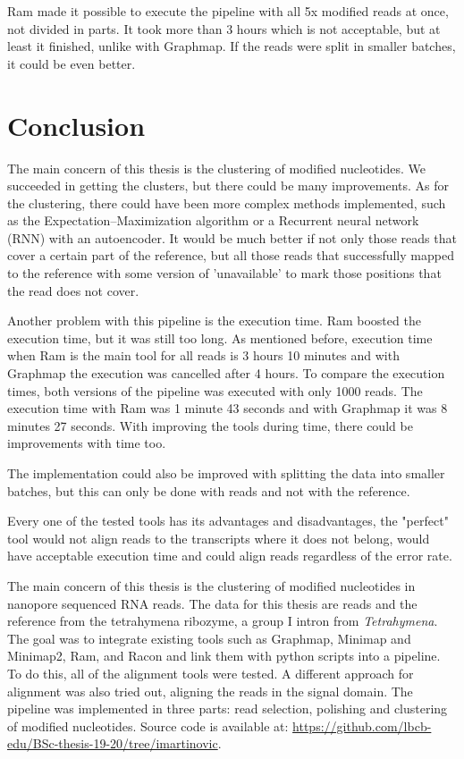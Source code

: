 \documentclass[times, utf8, zavrsni, numeric]{fer}
\begin{document}
Ram made it possible to execute the pipeline with all 5x modified reads at once,
not divided in parts. It took more than 3 hours which is not acceptable, 
but at least it finished, unlike with Graphmap. If the reads were split in 
smaller batches, it could be even better. 

\chapter{Conclusion}
The main concern of this thesis is the clustering of modified nucleotides. We 
succeeded in getting the clusters, but there could be many improvements. 
As for the clustering, there could have been more complex methods implemented, 
such as the Expectation–Maximization algorithm or a Recurrent neural network (RNN)
with an autoencoder. It would be much better if not only those reads that cover 
a certain part of the reference, but all those reads that successfully mapped 
to the reference with some version of 'unavailable' to mark those positions 
that the read does not cover. 

Another problem with this pipeline is the execution time. Ram boosted the
execution time, but it was still too long. As mentioned before, execution time
when Ram is the main tool for all reads is 3 hours 10 minutes and with Graphmap 
the execution was cancelled after 4 hours. To compare the execution times, 
both versions of the pipeline was executed with only 1000 reads. The execution time
with Ram was 1 minute 43 seconds and with Graphmap it was 8 minutes 27 seconds.
With improving the tools during time, there could be improvements with time too. 

The implementation could also be improved with splitting the data into 
smaller batches, but this can only be done with reads and not with the 
reference. 

Every one of the tested tools has its advantages and disadvantages, 
the "perfect" tool would not align reads to the transcripts where 
it does not belong, would have acceptable execution time and could 
align reads regardless of the error rate. 




\begin{sazetak}
The main concern of this thesis is the clustering of modified nucleotides in nanopore
sequenced RNA reads. The data for this thesis are reads and the reference from the 
tetrahymena ribozyme, a group I intron from \textit{Tetrahymena}. The goal was to 
integrate existing tools such as Graphmap, Minimap and Minimap2, Ram, and Racon
and link them with python scripts into a pipeline. To do this, all of the alignment 
tools were tested. A different approach for alignment was also tried out, aligning 
the reads in the signal domain. The pipeline was implemented in three parts: read
selection, polishing and clustering of modified nucleotides. 
Source code is available at: \url{https://github.com/lbcb-edu/BSc-thesis-19-20/tree/imartinovic}.

\end{sazetak}
\end{document}
